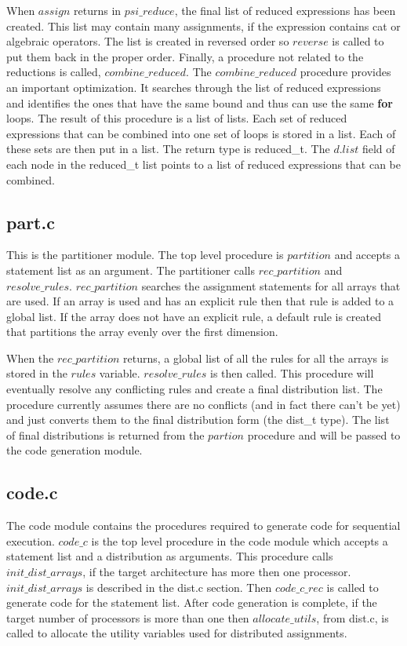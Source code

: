 When $assign$ returns in $psi\_reduce$, the final list of reduced expressions
has been created.  This list may contain many assignments, if the expression
contains cat or algebraic operators.  The list is created in reversed
order so $reverse$ is called to put them back in the proper order.  Finally,
a procedure not related to the reductions is called, $combine\_reduced$.
The $combine\_reduced$ procedure provides an important optimization.  It 
searches
through the list of reduced expressions and identifies the ones that have the
same bound and thus can use the same {\bf for} loops.  The result of this 
procedure is a list of lists.  Each set of reduced expressions that can be
combined into one set of loops is stored in a list.  Each of these sets
are then put in a list.  The return type is reduced\_t.  The $d.list$
field of each node in the reduced\_t list points to a list of reduced
expressions that can be combined.


\subsection{part.c}
This is the partitioner module.  The top level procedure is $partition$
and accepts a statement list as an argument.  The partitioner calls
$rec\_partition$ and $resolve\_rules$.  $rec\_partition$ searches the
assignment statements for all arrays that are used.  If an array
is used and has an explicit rule then that rule is added to a global
list.  If the array does not have an explicit rule, a default rule
is created that partitions the array evenly over the first dimension.

When the $rec\_partition$ returns, a global list of all the rules for
all the arrays is stored in the $rules$ variable.  $resolve\_rules$
is then called.  This procedure will eventually resolve any conflicting
rules and create a final distribution list.  The procedure currently assumes
there are no conflicts (and in fact there can't be yet) and just converts
them to the final distribution form (the dist\_t type).  The list
of final distributions is returned from the $partion$ procedure and
will be passed to the code generation module.

\subsection{code.c}
The code module contains the procedures required to generate code for 
sequential execution.  $code\_c$ is the top level procedure in
the code module which accepts a statement list and a distribution as
arguments.  This procedure calls $init\_dist\_arrays$, if the target
architecture has more then one processor.  $init\_dist\_arrays$ is described in
the dist.c section.  Then $code\_c\_rec$ is called to generate code for
the statement list.  After code generation is complete, if the target
number of processors is more than one then $allocate\_utils$, from
dist.c, is called to allocate the utility variables used for distributed
assignments.

